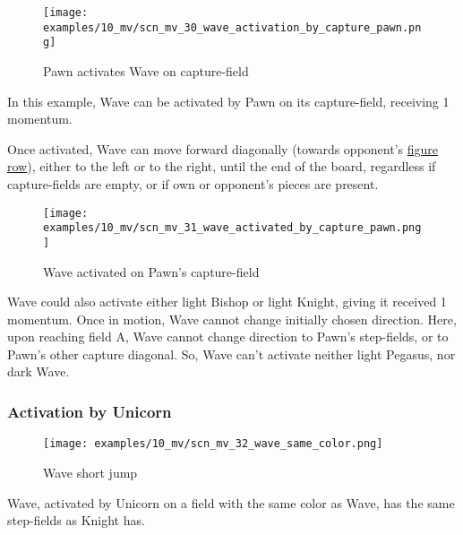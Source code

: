 \clearpage %

\vspace*{-2.1\baselineskip}
\noindent
\begin{figure}[!h]
\texttt{[image: examples/10\_mv/scn\_mv\_30\_wave\_activation\_by\_capture\_pawn.png]}
\caption{Pawn activates Wave on capture-field}
\label{fig:scn_mv_30_wave_activation_by_capture_pawn}
\end{figure}

In this example, Wave can be activated by Pawn on its capture-field, receiving 1 momentum.

Once activated, Wave can move forward diagonally (towards opponent's
\hyperref[sec:Terms/Figure row]{figure row}), either to the left or to the right, until the
end of the board, regardless if capture-fields are empty, or if own or opponent's pieces are
present.

\clearpage %

\vspace*{-2.1\baselineskip}
\noindent
\begin{figure}[!h]
\texttt{[image: examples/10\_mv/scn\_mv\_31\_wave\_activated\_by\_capture\_pawn.png]}
\caption{Wave activated on Pawn's capture-field}
\label{fig:scn_mv_31_wave_activated_by_capture_pawn}
\end{figure}

Wave could also activate either light Bishop or light Knight, giving it received 1 momentum.
Once in motion, Wave cannot change initially chosen direction. Here, upon reaching field A,
Wave cannot change direction to Pawn's step-fields, or to Pawn's other capture diagonal. So,
Wave can't activate neither light Pegasus, nor dark Wave.

\clearpage %

\subsubsection*{Activation by Unicorn}

\vspace*{-0.7\baselineskip}
\noindent
\begin{wrapfigure}[10]{l}{0.45\textwidth}
\centering
\texttt{[image: examples/10\_mv/scn\_mv\_32\_wave\_same\_color.png]}
\vspace*{-0.3\baselineskip}
\caption{Wave short jump}
\label{fig:scn_mv_32_wave_same_color}
\end{wrapfigure}
Wave, activated by Unicorn on a field with the same color as Wave, has the same step-fields
as Knight has.

